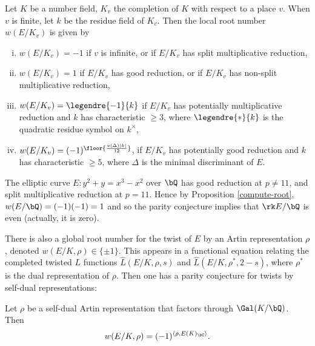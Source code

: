 \begin{prop}\cite[Theorem 3.1]{DD-BSD}\label{compute-root}
    Let $K$ be a number field, $K_v$ the completion of $K$ with respect to a place $v$. When $v$ is finite, 
    let $k$ be the residue field of $K_v$. Then the local root number $w(E / K_v)$ is given by 
    \begin{enumerate}[(i)]
        \setlength\itemsep{0em}
        \item $w(E / K_v) = -1$ if $v$ is infinite, or if  $E / K_v$ has split multiplicative reduction,
        \item $w(E / K_v) = 1$ if $E / K_v$ has good reduction, or if $E / K_v$ has non-split multiplicative reduction, 
        \item $w(E / K_v) = \legendre{-1}{k}$ if $E / K_v$ has potentially multiplicative reduction and $k$ has characteristic $\geq 3$, where $\legendre{*}{k}$ is the quadratic residue symbol on $k^{\times}$,
        \item $w(E / K_v) = (-1)^{\floor{\frac{v(\Delta)|k|}{12}}}$, if $E / K_v$ has potentially good reduction and $k$ has characteristic $\geq 5$, where $\Delta$ is the minimal discriminant of $E$.  
    \end{enumerate} 
\end{prop}

\begin{example}
    The elliptic curve $E \colon y^2 + y = x^3  - x^2$ over $\bQ$ has good reduction at $p \not= 11$, and split multiplicative reduction at $p = 11$. Hence by Proposition \ref{compute-root}, $w(E / \bQ) = (-1)(-1) = 1$ and so the parity conjecture implies that $\rk E / \bQ$ is even (actually, it is zero). 
\end{example}

There is also a global root number for the twist of $E$ by an Artin representation $\rho$, denoted $w(E / K, \rho) \in \{ \pm 1 \}$. This appears in a functional equation relating the completed twisted $L$ functions $\hat{L}(E / K, \rho, s)$ and $\hat{L}(E / K, \rho^*, 2 - s)$, where $\rho^*$ is the dual representation of $\rho$. Then one has a parity conjecture for twists by self-dual representations:

\begin{conj}
   Let $\rho$ be a self-dual Artin representation that factors through $\Gal(K / \bQ)$. Then $$ w(E / K, \rho) = (-1)^{\langle \rho, E(K)_{\bC} \rangle}.$$
\end{conj}


